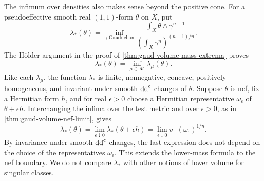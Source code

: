 The infimum over densities also makes sense beyond the positive cone. For a pseudoeffective smooth real $(1,1)$-form $\theta$ on $X$, put
\[
 \lambda_*(\theta)=
 \inf_{\gamma\text{ Gauduchon}}
 \frac{\int_X\theta\wedge\gamma^{n-1}}
      {(\int_X\gamma^n)^{(n-1)/n}}.
\]
The H\"older argument in the proof of \cref{thm:gaud-volume-mass-extrema} proves
\[
 \lambda_*(\theta)=\inf_{\mu\in\mathscr M}\lambda_\mu(\theta).
\]
Like each $\lambda_\mu$, the function $\lambda_*$ is finite, nonnegative, concave, positively homogeneous, and invariant under smooth $\mathrm{dd}^{\mathrm{c}}$ changes of $\theta$. Suppose $\theta$ is nef, fix a Hermitian form $h$, and for real $\epsilon>0$ choose a Hermitian representative $\omega_\epsilon$ of $\theta+\epsilon h$. Interchanging the infima over the test metric and over $\epsilon>0$, as in \cref{thm:gaud-volume-nef-limit}, gives
\[
 \lambda_*(\theta)
 =\lim_{\epsilon\downarrow0}\lambda_*(\theta+\epsilon h)
 =\lim_{\epsilon\downarrow0}v_-(\omega_\epsilon)^{1/n}.
\]
By invariance under smooth $\mathrm{dd}^{\mathrm{c}}$ changes, the last expression does not depend on the choice of the representatives $\omega_\epsilon$. This extends the lower-mass formula to the nef boundary. We do not compare $\lambda_*$ with other notions of lower volume for singular classes.
